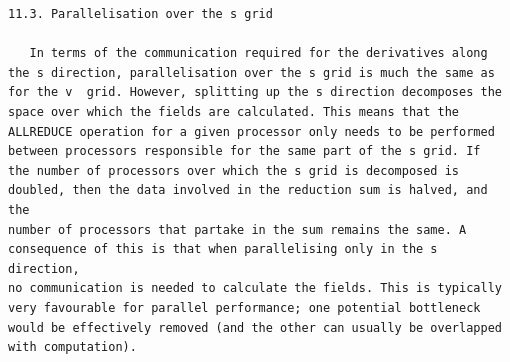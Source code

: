 \documentclass[a4paper]{article}
\newcommand{\gkwpagefont}{\fontsize{6.0pt}{7.55pt}\selectfont}
\begin{document}
\begin{Verbatim}[fontsize=\gkwpagefont]
11.3. Parallelisation over the s grid

   In terms of the communication required for the derivatives along the s direction, parallelisation over the s grid is much the same as
for the v  grid. However, splitting up the s direction decomposes the space over which the fields are calculated. This means that the
ALLREDUCE operation for a given processor only needs to be performed between processors responsible for the same part of the s grid. If
the number of processors over which the s grid is decomposed is doubled, then the data involved in the reduction sum is halved, and the
number of processors that partake in the sum remains the same. A consequence of this is that when parallelising only in the s direction,
no communication is needed to calculate the fields. This is typically very favourable for parallel performance; one potential bottleneck
would be effectively removed (and the other can usually be overlapped with computation).
\end{Verbatim}
\newpage
\end{document}
